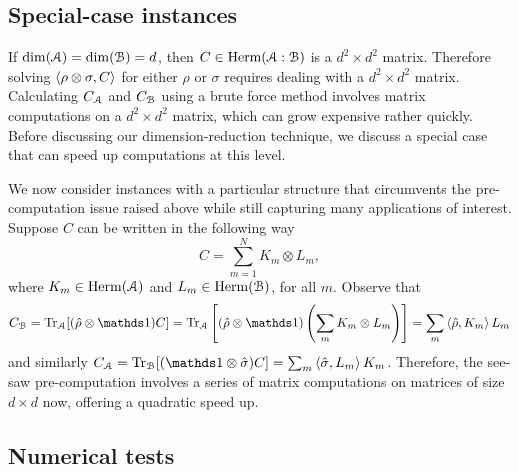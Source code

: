  
\subsection{Special-case instances} \label{sec:ch2_SEP-special}

If $\dim(\mathcal{A}) = \dim(\mathcal{B}) = d$, then $C \in \operatorname{Herm}(\mathcal{A} : \mathcal{B})$ is a $d^2 \times d^2$ matrix.  
Therefore solving $\left\langle \rho \otimes \sigma, C \right\rangle$ for either $\rho$ or $\sigma$ requires dealing with a $d^2 \times d^2$ matrix. 
Calculating $C_{\mathcal{A}}$ and $C_{\mathcal{B}}$ using a brute force method involves matrix computations on a $d^2 \times d^2$ matrix, which can grow expensive rather quickly. 
Before discussing our dimension-reduction technique, we discuss a special case that can speed up computations at this level. 

We now consider instances with a particular structure that circumvents the pre-computation issue raised above while still capturing many applications of interest. 
Suppose $C$ can be written in the following way 
\begin{equation} \label{eq:ch2_SEP-special}
    C = \sum_{m=1}^N K_m \otimes L_m,
\end{equation}
where $K_m \in \operatorname{Herm}(\mathcal{A})$ and $L_m \in \operatorname{Herm}(\mathcal{B})$, for all $m$. 
Observe that
\begin{equation}
    C_\B = \Tr_\A[(\hat{\rho} \otimes \id)C] = \Tr_\A \left[ (\hat{\rho} \otimes \id) \left( \sum_m K_m \otimes L_m \right) \right] = \sum_m \inner{\hat{\rho}}{K_m} L_m 
\end{equation}
and similarly  
    $C_\A = \Tr_\B[(\id \otimes \hat{\sigma})C] = \sum_m \inner{\hat{\sigma}}{L_m} K_m$.   
Therefore, the see-saw pre-computation involves a series of matrix computations on matrices of size $d \times d$ now, offering a quadratic speed up. 


\subsection{Numerical tests} 
  

